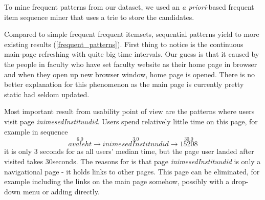 \documentclass[12pt, english,a4paper]{article}
\begin{document}
To mine frequent patterns from our dataset, we used an \emph{a priori}-based frequent item sequence miner that uses a trie to store the candidates\cite{seq_apriori}.


Compared to simple frequent frequent itemsets, sequential patterns yield to more existing results (\ref{frequent_patterns}). First thing to notice is the continuous main-page refreshing with quite big time intervals. Our guess is that it caused by the people in faculty who have set faculty website as their home page in browser and when they open up new browser window, home page is opened. There is no better explanation for this phenomenon as the main page is currently pretty static had seldom updated.

Most important result from usability point of view  are the patterns where users visit page \emph{inimesedInstituudid}. Users spend relatively little time on this page, for example in sequence
\[ 
\overset{6.0}{avaleht} \rightarrow \overset{3.0}{inimesedInstituudid} \rightarrow \overset{30.0}{15208} 
\]
it is only  3 seconds for as all users' median time, but the page user landed after visited takes 30seconds. The reasons for is that page  \emph{inimesedInstituudid}  is only a navigational page - it holds links to other pages. This page can be eliminated, for example including the links on the main page somehow, possibly with a drop-down menu or adding directly.
\end{document}
